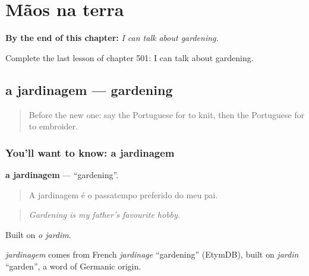 
\chapter{Mãos na terra}
\label{ch:pt-maos-na-terra}

\begin{chapteropening}
\textbf{By the end of this chapter:} \emph{I can talk about gardening.}

Complete the last lesson of chapter 501: I can talk about gardening.
\end{chapteropening}

\section[a jardinagem]{a jardinagem — gardening}

\label{lesson:PT-C501-jardinagem}



\begin{quote}
Before the new one: say the Portuguese for to knit, then the Portuguese for to embroider.
\end{quote}

\subsection*{You'll want to know: a jardinagem}
\textbf{a jardinagem} — \textquotedblleft{}gardening\textquotedblright{}.

\begin{quote}
A jardinagem é o passatempo preferido do meu pai.
\end{quote}

\begin{quote}
\emph{Gardening is my father's favourite hobby.}
\end{quote}

Built on \emph{o jardim}.

\begin{cousinweb}
\emph{jardinagem} comes from French \emph{jardinage} \textquotedblleft{}gardening\textquotedblright{} (EtymDB), built on \emph{jardin} \textquotedblleft{}garden\textquotedblright{}, a word of Germanic origin.
\end{cousinweb}

